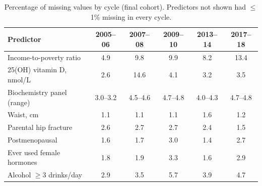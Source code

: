 \documentclass[11pt,a4paper]{article}
\begin{document}
\begin{table}[H]
\centering
\caption{Percentage of missing values by cycle (final cohort). Predictors not shown had $\le$1\% missing in every cycle.}
\label{tab:miss}
\small
\begin{tabular}{lccccc}
\toprule
Predictor & 2005--06 & 2007--08 & 2009--10 & 2013--14 & 2017--18 \\
\midrule
Income-to-poverty ratio & 4.9 & 9.8 & 9.9 & 8.2 & 13.4 \\
25(OH) vitamin D, nmol/L & 2.6 & 14.6 & 4.1 & 3.2 & 3.5 \\
Biochemistry panel (range) & 3.0--3.2 & 4.5--4.6 & 4.7--4.8 & 4.0--4.3 & 4.7--4.8 \\
Waist, cm & 1.1 & 1.1 & 1.1 & 1.6 & 1.2 \\
Parental hip fracture & 2.6 & 2.7 & 2.7 & 2.4 & 1.5 \\
Postmenopausal & 1.6 & 1.7 & 3.0 & 1.4 & 2.7 \\
Ever used female hormones & 1.8 & 1.9 & 3.3 & 1.6 & 2.9 \\
Alcohol $\ge$3 drinks/day & 2.9 & 3.5 & 5.7 & 3.9 & 4.7 \\
\bottomrule
\end{tabular}
\end{table}
\end{document}
